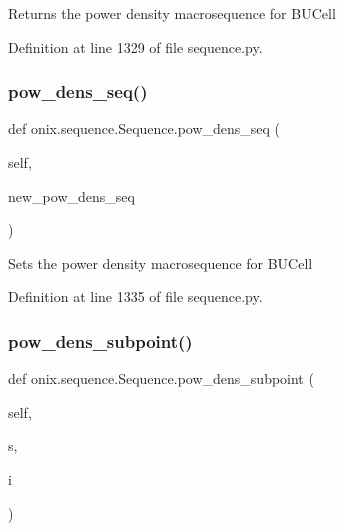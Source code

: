 \begin{DoxyVerb}Returns the power density macrosequence for BUCell
\end{DoxyVerb}
 

Definition at line 1329 of file sequence.\+py.

\mbox{\label{classonix_1_1sequence_1_1Sequence_aa357b20ca59aed435f2b17c4e88c0cb2}} 
\subsubsection{\texorpdfstring{pow\+\_\+dens\+\_\+seq()}{pow\_dens\_seq()}\hspace{0.1cm}{\footnotesize\ttfamily [2/2]}}
{\footnotesize\ttfamily def onix.\+sequence.\+Sequence.\+pow\+\_\+dens\+\_\+seq (\begin{DoxyParamCaption}\item[{}]{self,  }\item[{}]{new\+\_\+pow\+\_\+dens\+\_\+seq }\end{DoxyParamCaption})}

\begin{DoxyVerb}Sets the power density macrosequence for BUCell
\end{DoxyVerb}
 

Definition at line 1335 of file sequence.\+py.

\mbox{\label{classonix_1_1sequence_1_1Sequence_abee5c2f993c7b1a33cefffecfc9c264d}} 
\subsubsection{\texorpdfstring{pow\+\_\+dens\+\_\+subpoint()}{pow\_dens\_subpoint()}}
{\footnotesize\ttfamily def onix.\+sequence.\+Sequence.\+pow\+\_\+dens\+\_\+subpoint (\begin{DoxyParamCaption}\item[{}]{self,  }\item[{}]{s,  }\item[{}]{i }\end{DoxyParamCaption})}

